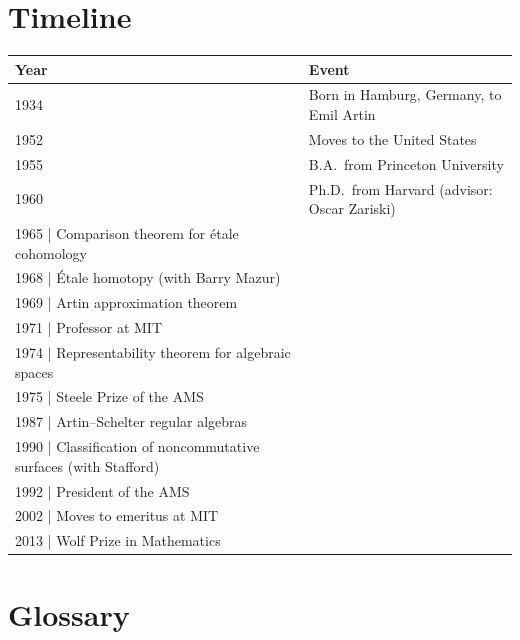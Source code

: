 \section*{Timeline}

\begin{tabularx}{\linewidth}{|p{1.5cm}|>{\raggedright\arraybackslash}X|}
\hline
\textbf{Year} & \textbf{Event} \\ \hline
1934 & Born in Hamburg, Germany, to Emil Artin \\ \hline
1952 & Moves to the United States \\ \hline
1955 & B.A.\ from Princeton University \\ \hline
1960 & Ph.D.\ from Harvard (advisor: Oscar Zariski) \\ \hline
1965 | Comparison theorem for \'etale cohomology \\ \hline
1968 | \'Etale homotopy (with Barry Mazur) \\ \hline
1969 | Artin approximation theorem \\ \hline
1971 | Professor at MIT \\ \hline
1974 | Representability theorem for algebraic spaces \\ \hline
1975 | Steele Prize of the AMS \\ \hline
1987 | Artin--Schelter regular algebras \\ \hline
1990 | Classification of noncommutative surfaces (with Stafford) \\ \hline
1992 | President of the AMS \\ \hline
2002 | Moves to emeritus at MIT \\ \hline
2013 | Wolf Prize in Mathematics \\ \hline
\end{tabularx}

\section*{Glossary}

